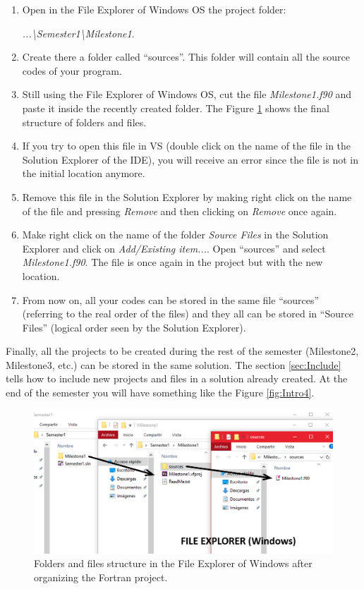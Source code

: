 \begin{enumerate}[nosep]
    \item Open in the File Explorer of Windows OS the project folder:
    
        \textit{...\textbackslash Semester1\textbackslash Milestone1}.
    
    \item Create there a folder called ``sources''. This folder will contain all the source codes of your program. 
    \item Still using the File Explorer of Windows OS, cut the file \textit{Milestone1.f90} and paste it inside the recently created folder. The Figure \ref{fig:Intro3} shows the final structure of folders and files.
    \item If you try to open this file in VS (double click on the name of the file in the Solution Explorer of the IDE), you will receive an error since the file is not in the initial location anymore. 
    \item Remove this file in the Solution Explorer by making right click on the name of the file and pressing \textit{Remove} and then clicking on \textit{Remove} once again.
    \item Make right click on the name of the folder \textit{Source Files} in the Solution Explorer and click on \textit{Add/Existing item...}. Open ``sources'' and select \textit{Milestone1.f90}. The file is once again in the project but with the new location. 
    \item From now on, all your codes can be stored in the same file ``sources'' (referring to the real order of the files) and they all can be stored in ``Source Files'' (logical order seen by the Solution Explorer). 
\end{enumerate}

Finally, all the projects to be created during the rest of the semester (Milestone2, Milestone3, etc.) can be stored in the same solution. The section \ref{sec:Include} tells how to include new projects and files in a solution already created. At the end of the semester you will have something like the Figure \ref{fig:Intro4}.

\begin{figure}
    \centering
    \includegraphics[width=  \textwidth]{Figures/Intro3}
    \caption{Folders and files structure in the File Explorer of Windows after organizing the Fortran project.}
    \label{fig:Intro3}
\end{figure}

